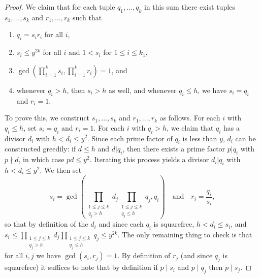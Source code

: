 \documentclass[11pt,letterpaper]{amsart}
\newcommand{\brac}[1]{\left( #1\right)}
\newcommand{\ogcd}[2]{\gcd(#1,#2)}
\newcommand{\bracgcd}[2]{\gcd\brac{#1,#2}}
\theoremstyle{definition}
\begin{document}
\begin{proof}
We claim that for each tuple $q_1, \dots, q_k$ in this sum there exist tuples $s_1, \dots, s_k$ and $r_1, \dots, r_k$ such that 
\begin{enumerate}
\item $q_i = s_ir_i$ for all $i$,
\item $s_i \leq y^{2k}$ for all $i$ and $1<s_i$ for $1\leq i\leq k_1$,
\item $\bracgcd{\prod_{i=1}^k s_i}{\prod_{i=1}^k r_i} = 1$, and 
\item whenever $q_i > h$, then $s_i > h$ as well, and 
whenever $q_i \le h$, we have $s_i = q_i$ and $r_i = 1$.
\end{enumerate}
To prove this, we construct $s_1, \dots, s_k$ and $r_1, \dots, r_k$ as follows. For each $i$ with $q_i \le h$, set $s_i = q_i$ and $r_i = 1$. For each $i$ with $q_i > h$, we claim that $q_i$ has a divisor $d_i$ with $h < d_i \leq y^2$. Since each prime factor of $q_i$ is less than $y$, $d_i$ can be constructed greedily: if $d \leq h$ and $d|q_i$, then there exists a prime factor $p|q_i$ with $p\nmid d$, in which case $pd \leq y^2$. Iterating this process yields a divisor $d_i|q_i$ with $h < d_i\leq y^2$. We then set 
\begin{equation*}
s_i = \bracgcd{\prod_{\substack{1 \le j \le k \\ q_j > h}} d_j \prod_{\substack{1 \le j \le k \\ q_j \le h}} q_j}{q_i}\quad\textrm{and}\quad r_i=\frac{q_i}{s_i},
\end{equation*}
so that by definition of the $d_i$ and since each $q_i$ is squarefree, $h < d_i \le s_i$,  and $s_i \le \prod_{\substack{1 \le j \le k \\ q_j > h}} d_j \prod_{\substack{1 \le j \le k \\ q_j \le h}} q_j \le y^{2k}$. The only remaining thing to check is that for all $i,j$ we have $\ogcd{s_i}{r_j}=1$. By definition of $r_j$ (and since $q_j$ is squarefree) it suffices to note that by definition if $p\mid s_i$ and $p\mid q_j$ then $p\mid s_j$.


\end{proof}
\end{document}
